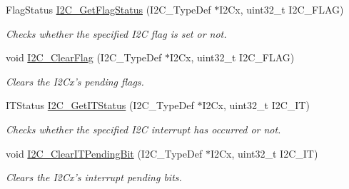 \begin{DoxyCompactItemize}
Flag\-Status \hyperlink{group___i2_c___group5_ga15c95d0ed124f029621a2061b1677ee7}{I2\-C\-\_\-\-Get\-Flag\-Status} (I2\-C\-\_\-\-Type\-Def $\ast$I2\-Cx, uint32\-\_\-t I2\-C\-\_\-\-F\-L\-A\-G)
\begin{DoxyCompactList}\small\item\em Checks whether the specified I2\-C flag is set or not. \end{DoxyCompactList}\item 
void \hyperlink{group___i2_c___group5_ga9d4f8fe9f7232696114b5578b1223963}{I2\-C\-\_\-\-Clear\-Flag} (I2\-C\-\_\-\-Type\-Def $\ast$I2\-Cx, uint32\-\_\-t I2\-C\-\_\-\-F\-L\-A\-G)
\begin{DoxyCompactList}\small\item\em Clears the I2\-Cx's pending flags. \end{DoxyCompactList}\item 
I\-T\-Status \hyperlink{group___i2_c___group5_ga447771fbbd94a56f3570b9f430a069ba}{I2\-C\-\_\-\-Get\-I\-T\-Status} (I2\-C\-\_\-\-Type\-Def $\ast$I2\-Cx, uint32\-\_\-t I2\-C\-\_\-\-I\-T)
\begin{DoxyCompactList}\small\item\em Checks whether the specified I2\-C interrupt has occurred or not. \end{DoxyCompactList}\item 
void \hyperlink{group___i2_c___group5_ga110dda440fa200b5f77349df19b3e6bb}{I2\-C\-\_\-\-Clear\-I\-T\-Pending\-Bit} (I2\-C\-\_\-\-Type\-Def $\ast$I2\-Cx, uint32\-\_\-t I2\-C\-\_\-\-I\-T)
\begin{DoxyCompactList}\small\item\em Clears the I2\-Cx's interrupt pending bits. \end{DoxyCompactList}\end{DoxyCompactItemize}


